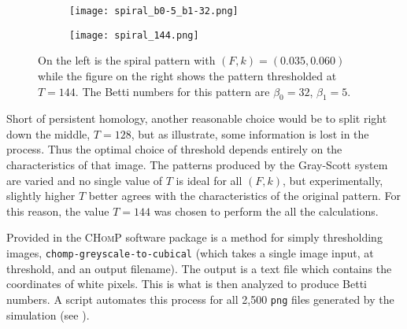 \begin{figure}[h]
	\centering
	\begin{subfigure}[b]{0.33\textwidth}
                \texttt{[image: spiral\_b0-5\_b1-32.png]}
                \caption{}
                \label{fig:spiral_grey}
        \end{subfigure} \quad
	\begin{subfigure}[b]{0.33\textwidth}
                \texttt{[image: spiral\_144.png]}
                \caption{}
                \label{fig:spiral_144}
        \end{subfigure}
        \caption{On the left is the spiral pattern with $(F, k) = (0.035, 0.060)$ while the figure on the right shows the pattern thresholded at $T = 144$. The Betti numbers for this pattern are $\beta_0 = 32$, $\beta_1 = 5$.}
        \label{fig:spiral_thresh}
\end{figure}

Short of persistent homology, another reasonable choice would be to split right down the middle, $T = 128$, but as  illustrate, some information is lost in the process. Thus the optimal choice of threshold depends entirely on the characteristics of that image. The patterns produced by the Gray-Scott system are varied and no single value of $T$ is ideal for all $(F, k)$, but experimentally, slightly higher $T$ better agrees with the characteristics of the original pattern. For this reason, the value $T = 144$ was chosen to perform the all the calculations.

Provided in the \textsc{CHomP} software package is a method for simply thresholding images, \texttt{chomp-greyscale-to-cubical} (which takes a single image input, at threshold, and an output filename). The output is a text file which contains the coordinates of white pixels. This is what is then analyzed to produce Betti numbers. A script automates this process for all 2,500 \texttt{png} files generated by the simulation (see ).

